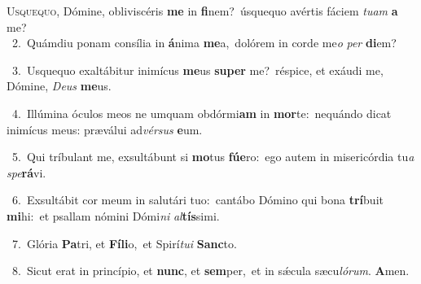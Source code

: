 \lettrine{\initial\textcolor{\initialcolor}{U}}{squequo,} Dómine, obliviscéris \textbf{me} in \textbf{fi}\-nem?~\star úsquequo avértis fáciem \textit{tu}\-\textit{am} \textbf{a} me?\\
{\numbfont\textcolor{\numbcolor}{~2.}}~Quámdiu ponam consília in \textbf{á}\-nima \textbf{me}\-a,~\star dolórem in corde me\textit{o} \textit{per} \textbf{di}\-em?\par
{\numbfont\textcolor{\numbcolor}{~3.}}~Usquequo exaltábitur inimícus \textbf{me}\-us \textbf{su}\-\textbf{per} me?~\star réspice, et exáudi me, Dómine, \textit{De}\-\textit{us} \textbf{me}\-us.\par
{\numbfont\textcolor{\numbcolor}{~4.}}~Illúmina óculos meos ne umquam obdórmi\textbf{am} in \textbf{mor}\-te:~\star nequándo dicat inimícus meus: præválui ad\-\textit{vér}\-\textit{sus} \textbf{e}\-um.\par
{\numbfont\textcolor{\numbcolor}{~5.}}~Qui tríbulant me, exsultábunt si \textbf{mo}\-tus \textbf{fú}\-\textbf{e}ro:~\star ego autem in misericórdia tu\textit{a} \textit{spe}\-\textbf{rá}vi.\par
{\numbfont\textcolor{\numbcolor}{~6.}}~Exsultábit cor meum in salutári tuo:~\dagger cantábo Dómino qui bona \textbf{trí}\-buit \textbf{mi}\-hi:~\star et psallam nómini Dómi\textit{ni} \textit{al}\-\textbf{tís}simi.\par
{\numbfont\textcolor{\numbcolor}{~7.}}~Glória \textbf{Pa}\-tri, et \textbf{Fí}\-\textbf{li}o,~\star et Spirí\-\textit{tu}\-\textit{i} \textbf{Sanc}\-to.\par
{\numbfont\textcolor{\numbcolor}{~8.}}~Sicut erat in princípio, et \textbf{nunc}\-, et \textbf{sem}\-per,~\star et in sǽcula sæcu\-\textit{ló}\-\textit{rum}. \textbf{A}\-men.\par
